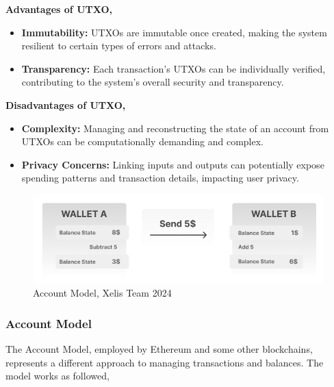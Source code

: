 \documentclass[12pt,a4paper,twocolumn]{article}
\begin{document}
\textbf{Advantages of UTXO,}\\
\begin{itemize}
\item \textbf{Immutability:} UTXOs are immutable once created, making the system resilient to certain types of errors and attacks.\\ 

\item \textbf{Transparency:} Each transaction’s UTXOs can be individually verified, contributing to the system's overall security and transparency.\\
\end{itemize}
\textbf{Disadvantages of UTXO,}\\ 
\begin{itemize}
\item \textbf{Complexity:} Managing and reconstructing the state of an account from UTXOs can be computationally demanding and complex.\\ 

\item \textbf{Privacy Concerns:} Linking inputs and outputs can potentially expose spending patterns and transaction details, impacting user privacy.\\
\end{itemize}
\begin{figure}
    \centering
    \includegraphics[width=0.9\linewidth]{Frame 2.png}
    \caption{Account Model, Xelis Team 2024}
\end{figure}

\subsubsection{Account Model}

The Account Model, employed by Ethereum and some other blockchains, represents a different approach to managing transactions and balances. The model works as followed,\\
\end{document}
